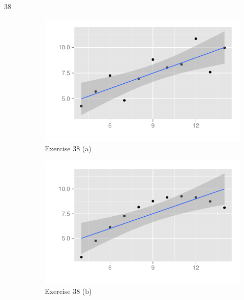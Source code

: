 \documentclass[letterpaper, landscape]{exam}
\begin{document}
\begin{description}
\begin{parts}
        \end{parts}

      \item[38]
        \begin{figure}[H]
          \centering
          \includegraphics[scale = 0.9]{figures/ex38a.pdf}
          \caption{Exercise 38 (a)}
          \label{fig:38a}
        \end{figure}

        \begin{figure}[H]
          \centering
          \includegraphics[scale = 0.9]{figures/ex38b.pdf}
          \caption{Exercise 38 (b)}
          \label{fig:38b}
        \end{figure}


\end{description}
\end{document}
